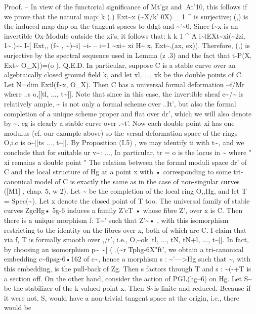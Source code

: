 \documentclass[11pt]{article}
\theoremstyle{plain}
\theoremstyle{definition}
\theoremstyle{remark}
\begin{document}
Proof. -- In view of the functorial significance of Mt'gz and .At'10, this follows if we prove that the natural map: k (.) Ext\textasciitilde{}x (\textasciitilde{}X/k' 0X) \_ 1 \textasciicircum{} is surjective; (,) is the induced map dap on the tangent spaces to ddgt and \textasciitilde{}'\textasciitilde{}0. Since f\textasciitilde{}x is an invertible Ox-Module outside the xi's, it follows that: k k 1 \textasciicircum{} A i\textasciitilde{}lEXt\textasciitilde{}xi(\textasciitilde{}2zi, 1\textasciitilde{}.)\textasciitilde{}- I-[ Ext,, (f\textasciitilde{} , \textasciitilde{})\textasciitilde{}i) \textasciitilde{}i- -- i=1 \textasciitilde{}xi\textasciitilde{} xi H\textasciitilde{} x, Ext\textasciitilde{},(ax, ex)). Therefore, (,) is surjective by the spectral sequence used in Lemma (z .3) and the fact that t-P(X, Ext\textasciitilde{} O\_X))=(o ). Q.E.D. In particular, suppose C is a stable curve over an algebraically closed ground field k, and let xl, ..., xk be the double points of C. Let N=dim Extl(f\textasciitilde{}x, O\_X). Then C has a universal formal deformation \textasciitilde{}f/Mr where ..s o,[[tl, ..., t\textasciitilde{}]]. Note that since in this case, the invertible sheaf c\textasciitilde{}/\textasciitilde{} is relatively ample, \textasciitilde{} is not only a formal scheme over ..It', but also the formal completion of a unique scheme proper and flat over dr', which we will also denote by \textasciitilde{}. cg is clearly a stable curve over .\textasciitilde{}t'. Now each double point xi has one modulus (cf. our example above) so the versal deformation space of the rings O,i.c is o\textasciitilde{}[[ts ..., t\textasciitilde{}]]. By Proposition (I.5) , we may identify ti with t\textasciitilde{}, and we conclude that for suitable ur v\textasciitilde{}: ..., In particular, tr = o is the locus in \textasciitilde{} where " xi remains a double point " The relation between the formal moduli space dr' of C and the local structure of Hg at a point x with • corresponding to some tri-canonical model of C is exactly the same as in the case of non-singular curves ([M1] , chap. 5, w 2). Let \textasciitilde{} be the completion of the local ring O,,Hg, and let T = Spec(\textasciitilde{}). Let x denote the closed point of T too. The universal family of stable curves ZgcHg• 5g-6 induces a family Z'cT • whose fibre Z', over x is C. Then there is a unique morphism f: T\textasciitilde{}' such that Z'\textasciitilde{}• , with this isomorphism restricting to the identity on the fibres over x, both of which are C. I claim that via f, T is formally smooth over ,/t', i.e., O,\textasciitilde{}ok[[tl, ..., tN, tN+l, ..., t\textasciitilde{}]]. In fact, by choosing an isomorphism p\textasciitilde{} \textasciitilde{}| ( .(\textasciitilde{}r Tphg-6X"ft', we obtain a tri-canonical embedding c\textasciitilde{}fipsg-6•162 of c\textasciitilde{}, hence a morphism s : \textasciitilde{}'--->Hg such that \textasciitilde{}, with this embedding, is the pull-back of Zg. Then s factors through T and s : \textasciitilde{}(-+T is a section off. On the other hand, consider the action of PGL(hg--6) on Hg. Let S\textasciitilde{} be the stabilizer of the k-valued point x. Then S\textasciitilde{}is finite and reduced. Because if it were not, S, would have a non-trivial tangent space at the origin, i.e., there would be 
\end{document}
